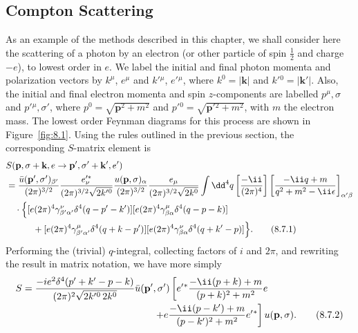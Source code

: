 
\subsection{Compton Scattering}

As an example of the methods described in this chapter, we shall consider
here the scattering of a photon by an electron (or other particle of spin
$\tfrac12$ and charge $-e$), to lowest order in $e$. We label the initial and
final photon momenta and polarization vectors by $k^\mu$, $e^\mu$ and
$k'{}^\mu$, $e'{}^\mu$, where $k^0=|\mathbf{k}|$ and
$k'{}^0=|\mathbf{k}'|$. Also, the initial and final electron momenta and spin
$z$-components are labelled $p^\mu,\sigma$ and $p'{}^\mu,\sigma'$, where
$p^0=\sqrt{\mathbf p^2+m^2}$ and $p'{}^0=\sqrt{\mathbf p'{}^2+m^2}$, with $m$
the electron mass. The lowest order Feynman diagrams for this process are
shown in Figure~\ref{fig:8.1}. Using the rules outlined in the previous section, the
corresponding $S$-matrix element is
\begin{align}
&S(\mathbf p,\sigma+\mathbf k,e\to
       \mathbf p',\sigma'+\mathbf k',e') \notag\\
&={\bar u(\mathbf p',\sigma')_{\beta'}\over(2\pi)^{3/2}}
 {e'^*_{\nu}\over(2\pi)^{3/2}\sqrt{2k'{}^0}}
 {u(\mathbf p,\sigma)_\alpha\over(2\pi)^{3/2}}
 {e_\mu\over(2\pi)^{3/2}\sqrt{2k^0}}
 \int \dd^4q\left[\frac{-\ii}{(2\pi)^4}\right]
 \left[\frac{-\ii\sl{q}+m}{q^2+m^2-\ii\epsilon}\right]_{\alpha'\beta}
 \notag\\
&\quad\cdot\Bigl\{
 [e(2\pi)^4\gamma^\nu_{\beta'\alpha'}\delta^4(q-p'-k')]
 [e(2\pi)^4\gamma^\mu_{\beta\alpha}\delta^4(q-p-k)]
 \notag\\
&\qquad\quad+
 [e(2\pi)^4\gamma^\mu_{\beta'\alpha'}\delta^4(q+k-p')]
 [e(2\pi)^4\gamma^\nu_{\beta\alpha}\delta^4(q+k'-p)]
 \Bigr\}.
\tag{8.7.1}\label{eq:8.7.1}
\end{align}
Performing the (trivial) $q$-integral, collecting factors of $i$ and $2\pi$,
and rewriting the result in matrix notation, we have more simply
\begin{align}
S={}&{-ie^2\delta^4(p'+k'-p-k)\over
 (2\pi)^2\sqrt{2k'{}^0\,2k^0}}\bar u(\mathbf p',\sigma')
 \left[\sl{e'}{}^*
 { -\ii(\sl{p}+\sl{k})+m\over(p+k)^2+m^2}\sl{e}\right.
 \notag\\[-2pt]
&\left.\hspace{43mm}+\sl{e}
 { -\ii(\sl{p}-\sl{k'})+m\over(p-k')^2+m^2}
 \sl{e'}{}^*\right]u(\mathbf p,\sigma).
\tag{8.7.2}\label{eq:8.7.2}
\end{align}
